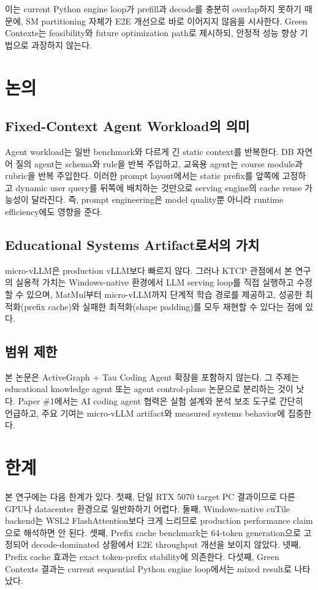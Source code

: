 \documentclass{kcc}
\begin{document}
이는 current Python engine loop가 prefill과 decode를 충분히 overlap하지 못하기 때문에, SM partitioning 자체가 E2E 개선으로 바로 이어지지 않음을 시사한다. Green Contexts는 feasibility와 future optimization path로 제시하되, 안정적 성능 향상 기법으로 과장하지 않는다.

\section{논의}
\subsection{Fixed-Context Agent Workload의 의미}
Agent workload는 일반 benchmark와 다르게 긴 static context를 반복한다. DB 자연어 질의 agent는 schema와 rule을 반복 주입하고, 교육용 agent는 course module과 rubric을 반복 주입한다. 이러한 prompt layout에서는 static prefix를 앞쪽에 고정하고 dynamic user query를 뒤쪽에 배치하는 것만으로 serving engine의 cache reuse 가능성이 달라진다. 즉, prompt engineering은 model quality뿐 아니라 runtime efficiency에도 영향을 준다.

\subsection{Educational Systems Artifact로서의 가치}
micro-vLLM은 production vLLM보다 빠르지 않다. 그러나 KTCP 관점에서 본 연구의 실용적 가치는 Windows-native 환경에서 LLM serving loop를 직접 실행하고 수정할 수 있으며, MatMul부터 micro-vLLM까지 단계적 학습 경로를 제공하고, 성공한 최적화(prefix cache)와 실패한 최적화(shape padding)를 모두 재현할 수 있다는 점에 있다.

\subsection{범위 제한}
본 논문은 ActiveGraph + Tau Coding Agent 확장을 포함하지 않는다. 그 주제는 educational knowledge agent 또는 agent control-plane 논문으로 분리하는 것이 낫다. Paper \#1에서는 AI coding agent 협력은 실험 설계와 분석 보조 도구로 간단히 언급하고, 주요 기여는 micro-vLLM artifact와 measured systems behavior에 집중한다.

\section{한계}
본 연구에는 다음 한계가 있다. 첫째, 단일 RTX 5070 target PC 결과이므로 다른 GPU나 datacenter 환경으로 일반화하기 어렵다. 둘째, Windows-native cuTile backend는 WSL2 FlashAttention보다 크게 느리므로 production performance claim으로 해석하면 안 된다. 셋째, Prefix cache benchmark는 64-token generation으로 고정되어 decode-dominated 상황에서 E2E throughput 개선을 보이지 않았다. 넷째, Prefix cache 효과는 exact token-prefix stability에 의존한다. 다섯째, Green Contexts 결과는 current sequential Python engine loop에서는 mixed result로 나타났다.
\end{document}
